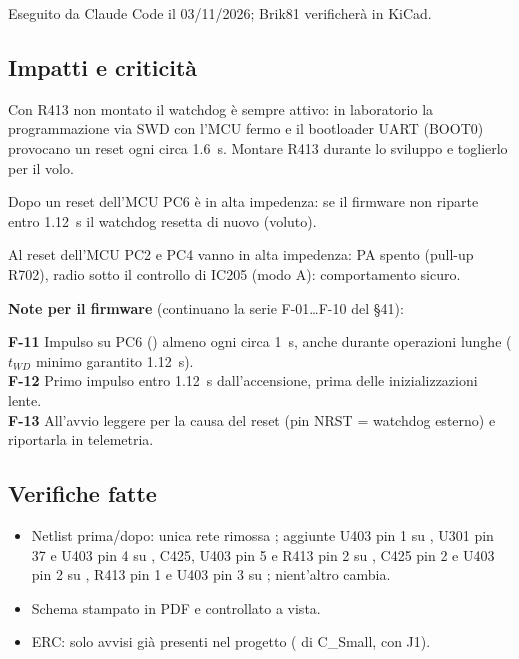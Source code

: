 Eseguito da Claude Code il 03/11/2026; Brik81 verificherà in KiCad.

\subsection{Impatti e criticità}
\begin{critbox}
Con R413 non montato il watchdog è sempre attivo: in laboratorio la programmazione via SWD con l'MCU fermo e il bootloader UART (BOOT0) provocano un reset ogni circa \SI{1,6}{\second}. Montare R413 durante lo sviluppo e toglierlo per il volo.
\end{critbox}
\begin{notebox}
Dopo un reset dell'MCU PC6 è in alta impedenza: se il firmware non riparte entro \SI{1,12}{\second} il watchdog resetta di nuovo (voluto).

Al reset dell'MCU PC2 e PC4 vanno in alta impedenza: PA spento (pull-up R702), radio sotto il controllo di IC205 (modo A): comportamento sicuro.
\end{notebox}

\textbf{Note per il firmware} (continuano la serie F-01\ldots F-10 del §41):
\begin{notebox}
\textbf{F-11} Impulso su PC6 () almeno ogni circa \SI{1}{\second}, anche durante operazioni lunghe ($t_{WD}$ minimo garantito \SI{1,12}{\second}).\\
\textbf{F-12} Primo impulso entro \SI{1,12}{\second} dall'accensione, prima delle inizializzazioni lente.\\
\textbf{F-13} All'avvio leggere  per la causa del reset (pin NRST = watchdog esterno) e riportarla in telemetria.
\end{notebox}

\subsection{Verifiche fatte}
\begin{itemize}
\item Netlist prima/dopo: unica rete rimossa ; aggiunte U403 pin 1 su , U301 pin 37 e U403 pin 4 su , C425, U403 pin 5 e R413 pin 2 su , C425 pin 2 e U403 pin 2 su , R413 pin 1 e U403 pin 3 su ; nient'altro cambia.
\item Schema stampato in PDF e controllato a vista.
\item ERC: solo avvisi già presenti nel progetto ( di C\_Small,  con J1).
\end{itemize}


